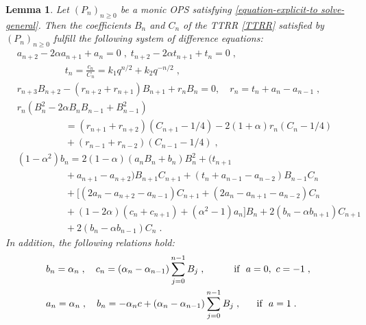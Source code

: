 \documentclass{amsart}
\newtheorem{lemma}[theorem]{Lemma}
\theoremstyle{remark}
\numberwithin{equation}{section}
\begin{document}
\small{
\begin{lemma}\label{system-in-genral-form-}
Let $(P_n)_{n\geq0}$ be a monic OPS satisfying \eqref{equation-explicit-to solve-general}. Then the coefficients $B_n$ and $C_{n}$ of the TTRR \eqref{TTRR} satisfied by $(P_n)_{n\geq0}$ fulfill the following system of difference equations: %
\begin{align}
&\label{eq1S-eq2S} a_{n+2}-2\alpha a_{n+1}+a_n=0\;,\; t_{n+2} -2\alpha t_{n+1}+t_{n} =0\;,\\
&\nonumber \quad\quad\quad\quad\quad t_n =\frac{c_n}{C_n} =k_1 q^{n/2}+k_2q^{-n/2}\;,  \\
&r_{n+3}B_{n+2} -(r_{n+2} +r_{n+1})B_{n+1}  +r_n B_n =0,\quad r_n= t_n +a_n -a_{n-1}\;,  \label{eq3S} \\
&\label{eq4S} r_n \left( B_{n} ^2 -2\alpha B_{n}B_{n-1} +B_{n-1}^2   \right)\\
&\nonumber \quad \quad\quad\quad\quad=(r_{n+1}+r_{n+2})(C_{n+1}-1/4) -2(1+\alpha)r_n(C_n -1/4)\\
 &\nonumber \quad\quad\quad\quad\quad+(r_{n-1}+r_{n-2})(C_{n-1} -1/4)\;, \\
&\label{eq5S} (1 -\alpha^2)b_n=2(1-\alpha)(a_nB_n+b_n)B_n ^2+(t_{n+1}\\
&\nonumber  \quad\quad\quad\quad\quad+a_{n+1}-a_{n+2})B_{n+1}C_{n+1}+(t_n+a_{n-1}-a_{n-2})B_{n-1}C_n \\
&\nonumber  \quad\quad\quad\quad\quad+\Big[(2a_n-a_{n+2}-a_{n-1})C_{n+1}+(2a_n -a_{n+1}-a_{n-2})C_n\\
&\nonumber \quad\quad\quad\quad\quad +(1-2\alpha)(c_n+c_{n+1})+(\alpha ^2 -1)a_n  \Big]B_n +2(b_n -\alpha b_{n+1} )C_{n+1}\\
&\nonumber \quad \quad\quad\quad\quad +2(b_n -\alpha b_{n-1})C_{n}\;.
\end{align}
In addition, the following relations hold:%
\begin{align}
&b_n =\alpha_n\;,\quad c_n =\left(\alpha_n -\alpha_{n-1}  \right)\sum_{j=0} ^{n-1} B_j\;,\quad\quad~ ~~\mbox{\rm if}~~ a=0,~c=-1\;, \label{power-pi1}\\
&a_n=\alpha_n\;,\quad b_n =-\alpha_n c+\left(\alpha_n-\alpha_{n-1} \right)\sum_{j=0} ^{n-1} B_j \;,\quad ~~\mbox{\rm if}~~a=1\;. \label{power-pi2}
\end{align}
\end{lemma}
}
\end{document}
